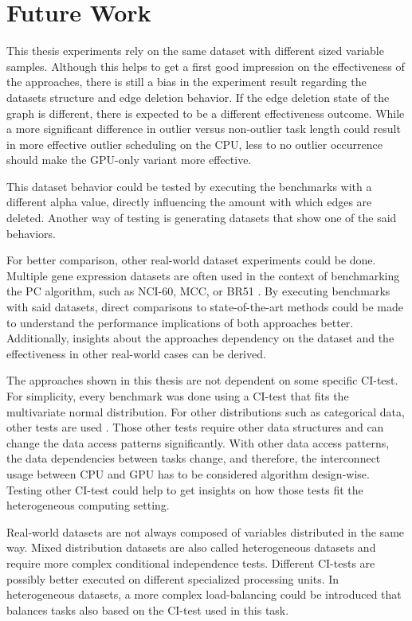 \chapter{Future Work}
\label{chap:fuwork}
This thesis experiments rely on the same dataset with different sized variable samples. Although this helps to get a first good impression on the effectiveness of the approaches, there is still a bias in the experiment result regarding the datasets structure and edge deletion behavior. If the edge deletion state of the graph is different, there is expected to be a different effectiveness outcome. While a more significant difference in outlier versus non-outlier task length could result in more effective outlier scheduling on the CPU, less to no outlier occurrence should make the GPU-only variant more effective.

This dataset behavior could be tested by executing the benchmarks with a different alpha value, directly influencing the amount with which edges are deleted. Another way of testing is generating datasets that show one of the said behaviors.

For better comparison, other real-world dataset experiments could be done. Multiple gene expression datasets are often used in the context of benchmarking the PC algorithm, such as NCI-60, MCC, or BR51 \cite{leFastPCAlgorithm2019}. By executing benchmarks with said datasets, direct comparisons to state-of-the-art methods could be made to understand the performance implications of both approaches better. Additionally, insights about the approaches dependency on the dataset and the effectiveness in other real-world cases can be derived.

The approaches shown in this thesis are not dependent on some specific CI-test. For simplicity, every benchmark was done using a CI-test that fits the multivariate normal distribution. For other distributions such as categorical data, other tests are used \cite{scutariLearningBayesianNetworks2010}. Those other tests require other data structures and can change the data access patterns significantly. With other data access patterns, the data dependencies between tasks change, and therefore, the interconnect usage between CPU and GPU has to be considered algorithm design-wise. Testing other CI-test could help to get insights on how those tests fit the heterogeneous computing setting.

Real-world datasets are not always composed of variables distributed in the same way. Mixed distribution datasets are also called heterogeneous datasets and require more complex conditional independence tests. Different CI-tests are possibly better executed on different specialized processing units. In heterogeneous datasets, a more complex load-balancing could be introduced that balances tasks also based on the CI-test used in this task.

